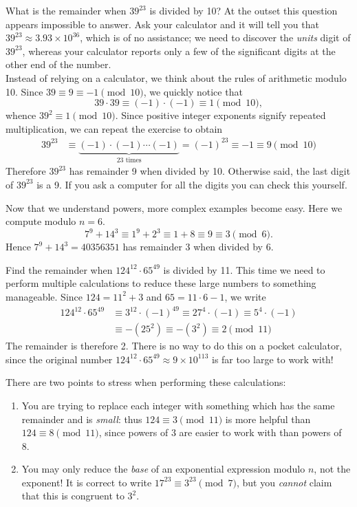 \begin{examples}
	\item What is the remainder when $39^{23}$ is divided by 10? At the outset this question appears impossible to answer. Ask your calculator and it will tell you that $39^{23}\approx 3.93\times 10^{36}$, which is of no assistance; we need to discover the \emph{units} digit of $39^{23}$, whereas your calculator reports only a few of the significant digits at the other end of the number.\\
	Instead of relying on a calculator, we think about the rules of arithmetic modulo 10. Since $39\equiv 9\equiv -1\pmod{10}$, we quickly notice that
	\[39\cdot 39\equiv (-1)\cdot(-1)\equiv 1\pmod{10},\]
	whence $39^2\equiv 1\pmod{10}$. Since positive integer exponents signify repeated multiplication, we can repeat the exercise to obtain
	\begin{align*}
	39^{23}&\equiv \underbrace{(-1)\cdot(-1)\cdots(-1)}_{\text{23 times}}=(-1)^{23}\equiv -1\equiv 9\pmod{10}
	\end{align*}
	Therefore $39^{23}$ has remainder 9 when divided by 10. Otherwise said, the last digit of $39^{23}$ is a 9. If you ask a computer for all  the digits you can check this yourself.
  \item Now that we understand powers, more complex examples become easy. Here we compute modulo $n=6$.
  \[7^9+14^3\equiv 1^9+2^3\equiv 1+8\equiv 9\equiv 3\pmod 6.\]
  Hence $7^9+14^3=40356351$ has remainder 3 when divided by 6.
  \item Find the remainder when $124^{12}\cdot 65^{49}$ is divided by 11. This time we need to perform multiple calculations to reduce these large numbers to something manageable. Since $124=11^2+3$ and $65=11\cdot 6-1$, we write
  \begin{align*}
  124^{12}\cdot 65^{49}&\equiv 3^{12}\cdot(-1)^{49}\equiv 27^4\cdot(-1)\equiv 5^4\cdot(-1)\\
  &\equiv -(25^2)\equiv -(3^2)\equiv 2\pmod{11}
  \end{align*}
  The remainder is therefore 2. There is no way to do this on a pocket calculator, since the original number $124^{12}\cdot 65^{49}\approx 9\times 10^{113}$ is far too large to work with!
\end{examples}

\noindent There are two points to stress when performing these calculations:
\begin{enumerate}
  \item You are trying to replace each integer with something which has the same remainder and is \emph{small}: thus $124\equiv 3\pmod{11}$ is more helpful than $124\equiv 8\pmod{11}$, since powers of 3 are easier to work with than powers of 8.
  \item You may only reduce the \emph{base} of an exponential expression modulo $n$, not the exponent! It is correct to write $17^{23}\equiv 3^{23}\pmod 7$, but you \emph{cannot} claim that this is congruent to $3^2$.
\end{enumerate}



